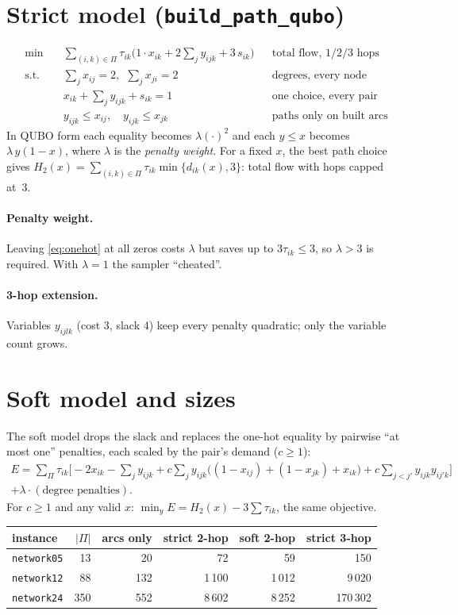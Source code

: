 \documentclass[11pt]{article}
\newcommand{\T}{\tau}
\newcommand{\Pairs}{\Pi}
\begin{document}
\section{Strict model (\texttt{build\_path\_qubo})}
\begin{align}
\min\quad & \textstyle\sum_{(i,k)\in\Pairs} \T_{ik}\big(1\cdot x_{ik} + 2\sum_{j} y_{ijk} + 3\, s_{ik}\big)
  &&\text{total flow, 1/2/3 hops}\\
\text{s.t.}\quad
& \textstyle\sum_j x_{ij}=2,\ \ \sum_j x_{ji}=2 && \text{degrees, every node}\\
& x_{ik}+\textstyle\sum_j y_{ijk}+s_{ik}=1 && \text{one choice, every pair}\label{eq:onehot}\\
& y_{ijk}\le x_{ij},\quad y_{ijk}\le x_{jk} && \text{paths only on built arcs}
\end{align}
In QUBO form each equality becomes $\lambda(\cdot)^2$ and each $y\le x$ becomes
$\lambda\,y(1-x)$, where $\lambda$ is the \emph{penalty weight}. For a fixed $x$, the best
path choice gives
$H_2(x)=\sum_{(i,k)\in\Pairs}\T_{ik}\min\{d_{ik}(x),3\}$: total flow with hops capped at~3.

\paragraph{Penalty weight.} Leaving \eqref{eq:onehot} at all zeros costs $\lambda$ but saves up to
$3\T_{ik}\le 3$, so $\lambda>3$ is required. With $\lambda=1$ the sampler ``cheated''.
\paragraph{3-hop extension.} Variables $y_{ijlk}$ (cost 3, slack 4) keep every penalty
quadratic; only the variable count grows.

\section{Soft model and sizes}
The soft model drops the slack and replaces the one-hot equality by pairwise ``at most one''
penalties, each scaled by the pair's demand ($c\ge 1$):
\begin{multline*}
E=\sum_{\Pairs}\T_{ik}\Big[-2x_{ik}-\sum_j y_{ijk}
 + c\sum_j y_{ijk}\big((1-x_{ij})+(1-x_{jk})+x_{ik}\big)
 + c\sum_{j<j'} y_{ijk}y_{ij'k}\Big]\\ + \lambda\cdot(\text{degree penalties}).
\end{multline*}
For $c\ge1$ and any valid $x$: $\min_y E = H_2(x)-3\sum\T_{ik}$, the same objective.
\begin{center}
\begin{tabular}{@{}lrrrrr@{}}
\toprule
instance & $|\Pairs|$ & arcs only & strict 2-hop & soft 2-hop & strict 3-hop\\
\midrule
\texttt{network05} & 13 & 20 & 72 & 59 & 150\\
\texttt{network12} & 88 & 132 & 1\,100 & 1\,012 & 9\,020\\
\texttt{network24} & 350 & 552 & 8\,602 & 8\,252 & 170\,302\\
\bottomrule
\end{tabular}
\end{center}
\end{document}
